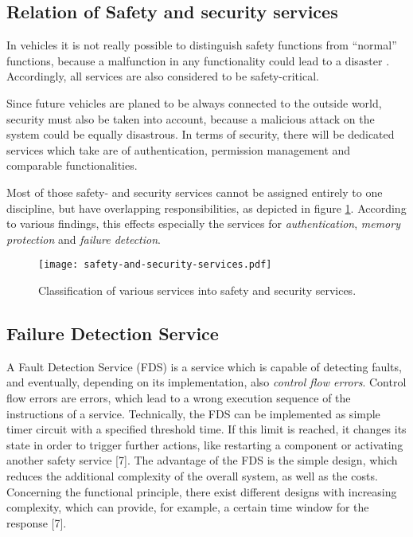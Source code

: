 \subsection{Relation of Safety and security services}

In vehicles it is not really possible to distinguish safety functions from ``normal'' functions, because a malfunction in any functionality could lead to a disaster \cite{iso26262:course2}. Accordingly, all services are also considered to be safety-critical.

Since future vehicles are planed to be always connected to the outside world, security must also be taken into account, because a malicious attack on the system could be equally disastrous. In terms of security, there will be dedicated services which take are of authentication, permission management and comparable functionalities.

Most of those safety- and security services cannot be assigned entirely to one discipline, but have overlapping responsibilities, as depicted in figure \ref{fig:safety-and-security-services}. According to various findings, this effects especially the services for \emph{authentication}, \emph{memory protection} and \emph{failure detection}.

\begin{figure}[!htbp]
\centering
\texttt{[image: safety-and-security-services.pdf]}
\caption{Classification of various services into safety and security services.}
\label{fig:safety-and-security-services}
\end{figure}




\subsection{Failure Detection Service}

A Fault Detection Service (FDS) is a service which is capable of detecting faults, and eventually, depending on its implementation, also \emph{control flow errors}. Control flow errors are errors, which lead to a wrong execution sequence of the instructions of a service. Technically, the FDS can be implemented as simple timer circuit with a specified threshold time. If this limit is reached, it changes its state in order to trigger further actions, like restarting a component or activating another safety service [7]. The advantage of the FDS is the simple design, which reduces the additional complexity of the overall system, as well as the costs. Concerning the functional principle, there exist different designs with increasing complexity, which can provide, for example, a certain time window for the response [7].



